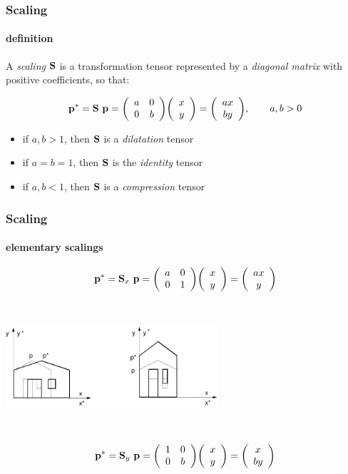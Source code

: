 \documentclass{beamer}
\begin{document}
\begin{frame}\frametitle{Scaling}
\framesubtitle{definition}

\vfill

A \emph{scaling}  $\T{S}$ is a transformation tensor represented by a \emph{diagonal matrix} with positive coefficients, so that:

\[
\p{p}^* = \T{S}\ \p{p} =
\mat{
a & 0 \\
0 & b
}\vet{x \\ y}
= \vet{ax \\ by},
\qquad
a,b >0
\]

\vfill

\begin{itemize}
\vfill\item 
if $a,b>1$, then $\T{S}$ is a \emph{dilatation} tensor
\vfill\item 
if $a=b=1$, then $\T{S}$ is the \emph{identity} tensor
\vfill\item 
if $a,b<1$, then $\T{S}$ is a \emph{compression} tensor
\end{itemize}

\vfill
\end{frame}
\begin{frame}\frametitle{Scaling}
\framesubtitle{elementary scalings}\small

\vfill

\begin{minipage}[c]{6cm}
\[
\p{p}^* = \T{S}_x\ \p{p} =
\mat{
a & 0 \\
0 & 1
}
\vet{x \\ y}
= \vet{ax \\ y}
\]\end{minipage}\hfill~



\vfill
\begin{center}
\includegraphics[height=30mm]{images/scala1}
\end{center}
\vfill

~\hfill\begin{minipage}[c]{6cm}
\[
\p{p}^* = \T{S}_y\ \p{p} =
\mat{
1 & 0 \\
0 & b
}
\vet{x \\ y}
= \vet{x \\ by}
\]\end{minipage}

\end{frame}
\end{document}
